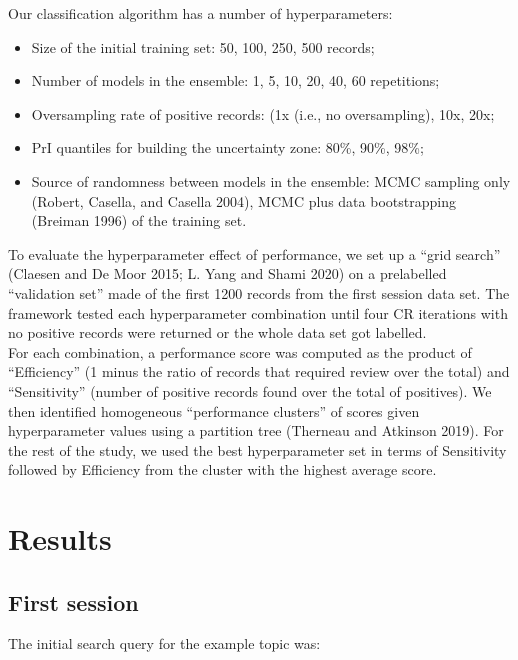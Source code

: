 \documentclass{article}
\begin{document}
Our classification algorithm has a number of hyperparameters:

\begin{itemize}
\tightlist
\item
  Size of the initial training set: 50, 100, 250, 500 records;
\item
  Number of models in the ensemble: 1, 5, 10, 20, 40, 60 repetitions;
\item
  Oversampling rate of positive records: (1x (i.e., no oversampling),
  10x, 20x;
\item
  PrI quantiles for building the uncertainty zone: 80\%, 90\%, 98\%;
\item
  Source of randomness between models in the ensemble: MCMC sampling
  only (Robert, Casella, and Casella 2004), MCMC plus data bootstrapping
  (Breiman 1996) of the training set.
\end{itemize}

To evaluate the hyperparameter effect of performance, we set up a ``grid
search'' (Claesen and De Moor 2015; L. Yang and Shami 2020) on a
prelabelled ``validation set'' made of the first 1200 records from the
first session data set. The framework tested each hyperparameter
combination until four CR iterations with no positive records were
returned or the whole data set got labelled.\\
For each combination, a performance score was computed as the product of
``Efficiency'' (1 minus the ratio of records that required review over
the total) and ``Sensitivity'' (number of positive records found over
the total of positives). We then identified homogeneous ``performance
clusters'' of scores given hyperparameter values using a partition tree
(Therneau and Atkinson 2019). For the rest of the study, we used the
best hyperparameter set in terms of Sensitivity followed by Efficiency
from the cluster with the highest average score.\\

\hypertarget{results}{%
\section{Results}\label{results}}

\hypertarget{first-session}{%
\subsection{First session}\label{first-session}}

The initial search query for the example topic was:\\
\end{document}
